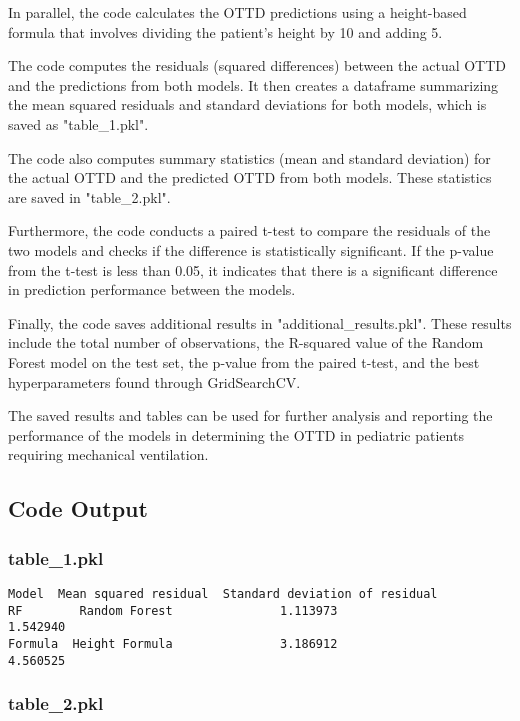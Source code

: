\documentclass[11pt]{article}
\begin{document}
In parallel, the code calculates the OTTD predictions using a height-based formula that involves dividing the patient's height by 10 and adding 5. 

The code computes the residuals (squared differences) between the actual OTTD and the predictions from both models. It then creates a dataframe summarizing the mean squared residuals and standard deviations for both models, which is saved as "table\_1.pkl".

The code also computes summary statistics (mean and standard deviation) for the actual OTTD and the predicted OTTD from both models. These statistics are saved in "table\_2.pkl".

Furthermore, the code conducts a paired t-test to compare the residuals of the two models and checks if the difference is statistically significant. If the p-value from the t-test is less than 0.05, it indicates that there is a significant difference in prediction performance between the models.

Finally, the code saves additional results in "additional\_results.pkl". These results include the total number of observations, the R-squared value of the Random Forest model on the test set, the p-value from the paired t-test, and the best hyperparameters found through GridSearchCV.

The saved results and tables can be used for further analysis and reporting the performance of the models in determining the OTTD in pediatric patients requiring mechanical ventilation.

\subsection{Code Output}

\subsubsection*{table\_1.pkl}

\begin{Verbatim}[tabsize=4]
                  Model  Mean squared residual  Standard deviation of residual
RF        Random Forest               1.113973                        1.542940
Formula  Height Formula               3.186912                        4.560525
\end{Verbatim}

\subsubsection*{table\_2.pkl}
\end{document}
